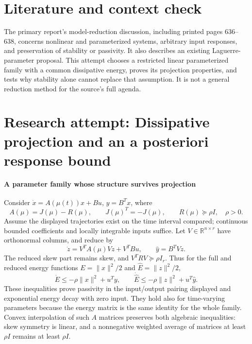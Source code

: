 \documentclass[11pt]{article}
\begin{document}
\section{Literature and context check}
The primary report's model-reduction discussion, including printed pages 636--638, concerns nonlinear and parameterized systems, arbitrary input responses, and preservation of stability or passivity. It also describes an existing Laguerre-parameter proposal. This attempt chooses a restricted linear parameterized family with a common dissipative energy, proves its projection properties, and tests why stability alone cannot replace that assumption. It is not a general reduction method for the source's full agenda.
\section{Research attempt: Dissipative projection and an a posteriori response bound}

\paragraph{A parameter family whose structure survives projection}
Consider $\dot x=A(\mu(t))x+Bu$, $y=B^Tx$, where
\[
 A(\mu)=J(\mu)-R(\mu),\qquad J(\mu)^T=-J(\mu),\qquad R(\mu)\succeq\rho I,
 \quad\rho>0.
\]
Assume the displayed trajectories exist on the time interval compared; continuous bounded coefficients and locally integrable inputs suffice. Let $V\in\mathbb R^{n\times r}$ have orthonormal columns, and reduce by
\[
 \dot z=V^TA(\mu)Vz+V^TBu,\qquad \widehat y=B^TVz.
\]
The reduced skew part remains skew, and $V^TRV\succeq\rho I_r$. Thus for the full and reduced energy functions $E=\lVert x\rVert^2/2$ and $\widehat E=\lVert z\rVert^2/2$,
\[
 \dot E\leq-\rho\lVert x\rVert^2+u^Ty,
 \qquad \dot{\widehat E}\leq-\rho\lVert z\rVert^2+u^T\widehat y.
\]
These inequalities prove passivity in the input/output pairing displayed and exponential energy decay with zero input. They hold also for time-varying parameters because the energy matrix is the same identity for the whole family. Convex interpolation of such $A$ matrices preserves both algebraic inequalities: skew symmetry is linear, and a nonnegative weighted average of matrices at least $\rho I$ remains at least $\rho I$.
\end{document}
